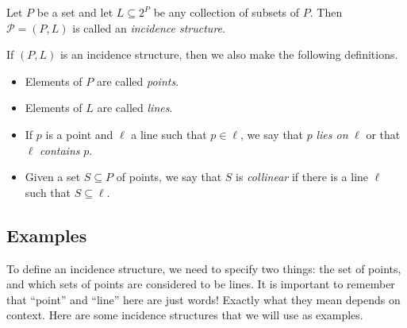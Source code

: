 \documentclass{article}
\begin{document}

\begin{dfn}
Let $P$ be a set and let $L \subseteq 2^P$ be any collection of subsets of $P$. Then $\mathcal{P} = (P,L)$ is called an \emph{incidence structure}.
\end{dfn}

If $(P,L)$ is an incidence structure, then we also make the following definitions.
\begin{itemize}
\item Elements of $P$ are called \emph{points}.
\item Elements of $L$ are called \emph{lines}.
\item If $p$ is a point and $\ell$ a line such that $p \in \ell$, we say that $p$ \emph{lies on} $\ell$ or that $\ell$ \emph{contains} $p$.
\item Given a set $S \subseteq P$ of points, we say that $S$ is \emph{collinear} if there is a line $\ell$ such that $S \subseteq \ell$.
\end{itemize}



\subsection*{Examples}

To define an incidence structure, we need to specify two things: the set of points, and which sets of points are considered to be lines. It is important to remember that ``point'' and ``line'' here are just words! Exactly what they mean depends on context. Here are some incidence structures that we will use as examples.
\end{document}
